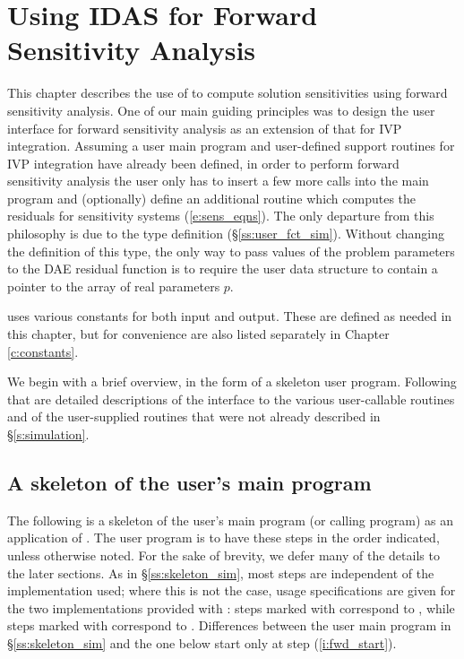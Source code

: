 \chapter{Using IDAS for Forward Sensitivity Analysis}\label{s:forward}

This chapter describes the use of {\idas} to compute solution sensitivities using
forward sensitivity analysis. One of our main guiding principles was to design 
the {\idas} user interface for forward sensitivity analysis as an extension of
that for IVP integration. Assuming a user main program and user-defined support 
routines for IVP integration have already been defined, in order to perform 
forward sensitivity analysis the user only has to insert a few more calls 
into the main program and (optionally) define an additional routine which
computes the residuals for sensitivity systems (\ref{e:sens_eqns}). 
The only departure from this philosophy is due to the  type definition
(\S\ref{ss:user_fct_sim}). Without changing the definition of this type, the
only way to pass values of the problem parameters to the DAE residual
function is to require the user data structure  to contain a pointer
to the array of real parameters $p$.

{\idas} uses various constants for both input and output.  These are
defined as needed in this chapter, but for convenience are also listed
separately in Chapter \ref{c:constants}.

We begin with a brief overview, in the form of a skeleton user program.
Following that are detailed descriptions of the interface to the
various user-callable routines and of the user-supplied routines that were not already
described in \S\ref{s:simulation}.

\section{A skeleton of the user's main program}\label{s:forward_usage}

The following is a skeleton of the user's main program (or calling
program) as an application of {\idas}. The user program is to have these 
steps in the order indicated, unless otherwise noted.
For the sake of brevity, we defer many of the details to the later sections.
As in \S\ref{ss:skeleton_sim}, most steps are independent of the {\nvector}
implementation used; where this is not the case, usage specifications are given for the
two implementations provided with {\idas}: steps marked with {\p} correspond to 
{\nvecp}, while steps marked with {\s} correspond to {\nvecs}.
Differences between the user main program in \S\ref{ss:skeleton_sim} and
the one below start only at step (\ref{i:fwd_start}).

